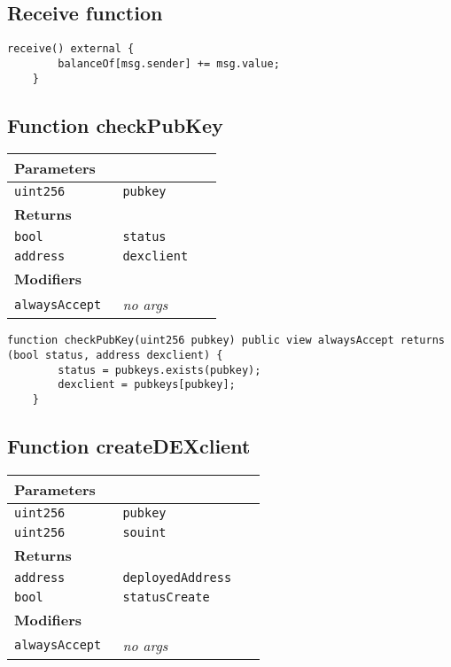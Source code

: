 \subsection{Receive function}

\vspace{2cm}

\begin{lstlisting}[firstnumber=76]
	receive() external {
		balanceOf[msg.sender] += msg.value;
	}
\end{lstlisting}

\subsection{Function checkPubKey}


\ifsoltables
\noindent\begin{tabular}{|l|l|p{5cm}|}\hline
\multicolumn{3}{|l|}{\bf Parameters}\\\hline
\tt uint256 & \tt pubkey &\\\hline
\multicolumn{3}{|l|}{\bf Returns}\\\hline
\tt bool & \tt status &\\\hline
\tt address & \tt dexclient &\\\hline
\multicolumn{3}{|l|}{\bf Modifiers}\\\hline
\tt alwaysAccept & {\em no args} &\\\hline
\end{tabular}
\fi

\vspace{2cm}

\begin{lstlisting}[firstnumber=328]
	function checkPubKey(uint256 pubkey) public view alwaysAccept returns (bool status, address dexclient) {
		status = pubkeys.exists(pubkey);
		dexclient = pubkeys[pubkey];
	}
\end{lstlisting}

\subsection{Function createDEXclient}


\ifsoltables
\noindent\begin{tabular}{|l|l|p{5cm}|}\hline
\multicolumn{3}{|l|}{\bf Parameters}\\\hline
\tt uint256 & \tt pubkey &\\\hline
\tt uint256 & \tt souint &\\\hline
\multicolumn{3}{|l|}{\bf Returns}\\\hline
\tt address & \tt deployedAddress &\\\hline
\tt bool & \tt statusCreate &\\\hline
\multicolumn{3}{|l|}{\bf Modifiers}\\\hline
\tt alwaysAccept & {\em no args} &\\\hline
\end{tabular}
\fi

